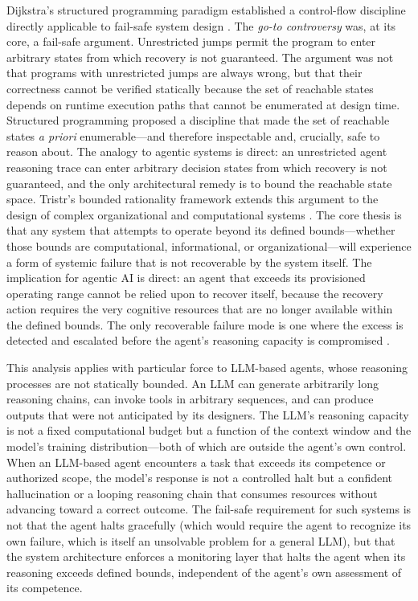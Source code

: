 Dijkstra's structured programming paradigm established a control-flow discipline directly applicable to fail-safe system design \cite{dijkstra1982}. The \emph{go-to controversy} was, at its core, a fail-safe argument. Unrestricted jumps permit the program to enter arbitrary states from which recovery is not guaranteed. The argument was not that programs with unrestricted jumps are always wrong, but that their correctness cannot be verified statically because the set of reachable states depends on runtime execution paths that cannot be enumerated at design time. Structured programming proposed a discipline that made the set of reachable states \emph{a priori} enumerable---and therefore inspectable and, crucially, safe to reason about. The analogy to agentic systems is direct: an unrestricted agent reasoning trace can enter arbitrary decision states from which recovery is not guaranteed, and the only architectural remedy is to bound the reachable state space. Tristr's bounded rationality framework extends this argument to the design of complex organizational and computational systems \cite{tristr81}. The core thesis is that any system that attempts to operate beyond its defined bounds---whether those bounds are computational, informational, or organizational---will experience a form of systemic failure that is not recoverable by the system itself. The implication for agentic AI is direct: an agent that exceeds its provisioned operating range cannot be relied upon to recover itself, because the recovery action requires the very cognitive resources that are no longer available within the defined bounds. The only recoverable failure mode is one where the excess is detected and escalated before the agent's reasoning capacity is compromised \cite{tristr81}.

This analysis applies with particular force to LLM-based agents, whose reasoning processes are not statically bounded. An LLM can generate arbitrarily long reasoning chains, can invoke tools in arbitrary sequences, and can produce outputs that were not anticipated by its designers. The LLM's reasoning capacity is not a fixed computational budget but a function of the context window and the model's training distribution---both of which are outside the agent's own control. When an LLM-based agent encounters a task that exceeds its competence or authorized scope, the model's response is not a controlled halt but a confident hallucination or a looping reasoning chain that consumes resources without advancing toward a correct outcome. The fail-safe requirement for such systems is not that the agent halts gracefully (which would require the agent to recognize its own failure, which is itself an unsolvable problem for a general LLM), but that the system architecture enforces a monitoring layer that halts the agent when its reasoning exceeds defined bounds, independent of the agent's own assessment of its competence.

